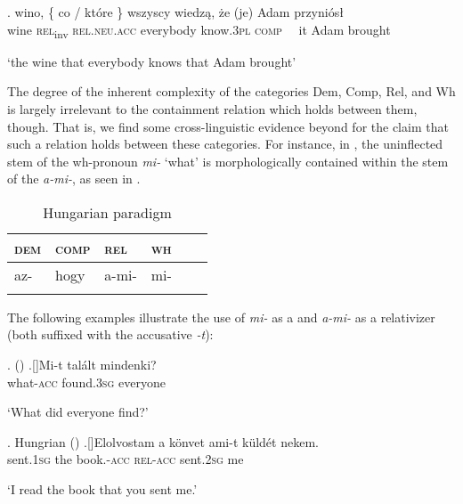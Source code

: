 \exg. wino, \{ co / {kt\'ore \}} wszyscy wiedz\k{a}, \.ze (je) Adam przyni\'os\l\\
wine {} \textsc{rel}\textsubscript{inv} {} \textsc{rel.neu.acc} everybody know.\textsc{3pl} \textsc{comp} \ \ it Adam brought\\
\strut `the wine that everybody knows that Adam brought'

\noindent The degree of the inherent complexity of the categories Dem, Comp, Rel, and Wh is largely irrelevant to the containment relation which holds between them, though. That is, we find some cross-linguistic evidence beyond  for the claim that such a relation holds between these categories. For instance, in , the uninflected stem of the wh-pronoun \textit{mi-} `what' is morphologically contained within the stem of the  \textit{a-mi-}, as seen in .

\begin{table}
\caption{Hungarian paradigm\label{Ungarowie}}
\begin{tabular}[t]{ l l l l l l }
\lsptoprule
\textsc{dem} 	& \textsc{comp} & \textsc{rel}  	& \textsc{wh}\\	
\midrule
az- & hogy & a-mi- & mi-\\
\lspbottomrule
\end{tabular}
\end{table}

\noindent The following examples illustrate the use of \textit{mi-} as a  and \textit{a-mi-} as a relativizer (both suffixed with the accusative \textit{-t}):

\ex.  (\citealt[11]{Kenesei1998})
\ag.[]\hspace{-22pt}Mi-t 	tal\'alt 	mindenki?\\
\hspace{-22pt}what-\textsc{acc} 	found.\textsc{3sg} 	everyone\\
\hspace{-22pt}\strut `What did everyone find?'

\ex. Hungrian (\citealt[136]{Rounds2001})
\ag.[]\hspace{-22pt}Elolvostam a 	k\"onvet 	ami-t k\"uld\'et nekem.\\
\hspace{-22pt}sent.\textsc{1sg} the	book.\textsc{-acc}	\textsc{rel-acc}	sent.\textsc{2sg} me\\
\hspace{-22pt}\strut `I read the book that you sent me.'


